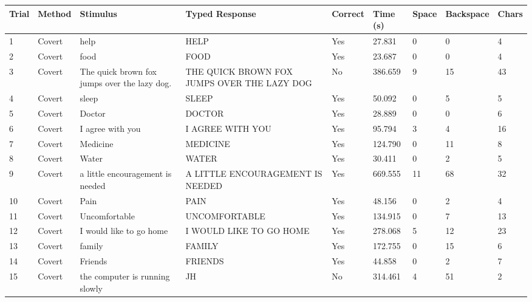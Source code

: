 \documentclass[10pt,a4paper]{article}
\begin{document}
\begin{center}
\begin{tabularx}{\textwidth}{
    C{0.45in}
    C{0.65in}
    L{2.35in}
    L{2.55in}
    C{0.65in}
    C{0.65in}
    C{0.55in}
    C{0.75in}
    C{0.55in}
}
\toprule

\textbf{Trial} &
\textbf{Method} &
\textbf{Stimulus} &
\textbf{Typed Response} &
\textbf{Correct} &
\textbf{Time (s)} &
\textbf{Space} &
\textbf{Backspace} &
\textbf{Chars}
\\

\midrule

1 &
Covert &
help &
HELP &
Yes &
27.831 &
0 &
0 &
4
\\

2 &
Covert &
food &
FOOD &
Yes &
23.687 &
0 &
0 &
4
\\

3 &
Covert &
The quick brown fox jumps over the lazy dog. &
THE QUICK BROWN FOX JUMPS OVER THE LAZY DOG &
No &
386.659 &
9 &
15 &
43
\\

4 &
Covert &
sleep &
SLEEP &
Yes &
50.092 &
0 &
5 &
5
\\

5 &
Covert &
Doctor &
DOCTOR &
Yes &
28.889 &
0 &
0 &
6
\\

6 &
Covert &
I agree with you &
I AGREE WITH YOU &
Yes &
95.794 &
3 &
4 &
16
\\

7 &
Covert &
Medicine &
MEDICINE &
Yes &
124.790 &
0 &
11 &
8
\\

8 &
Covert &
Water &
WATER &
Yes &
30.411 &
0 &
2 &
5
\\

9 &
Covert &
a little encouragement is needed &
A LITTLE ENCOURAGEMENT IS NEEDED &
Yes &
669.555 &
11 &
68 &
32
\\

10 &
Covert &
Pain &
PAIN &
Yes &
48.156 &
0 &
2 &
4
\\

11 &
Covert &
Uncomfortable &
UNCOMFORTABLE &
Yes &
134.915 &
0 &
7 &
13
\\

12 &
Covert &
I would like to go home &
I WOULD LIKE TO GO HOME &
Yes &
278.068 &
5 &
12 &
23
\\

13 &
Covert &
family &
FAMILY &
Yes &
172.755 &
0 &
15 &
6
\\

14 &
Covert &
Friends &
FRIENDS &
Yes &
44.858 &
0 &
2 &
7
\\

15 &
Covert &
the computer is running slowly &
JH &
No &
314.461 &
4 &
51 &
2
\\

\bottomrule
\end{tabularx}
\end{center}
\end{document}
